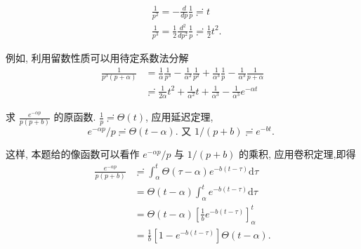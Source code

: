 $$    \begin{aligned}
    & \frac{1}{p^2}=-\frac{d}{d p} \frac{1}{p} \risingdotseq  t \\
    & \frac{1}{p^3}=\frac{1}{2} \frac{d^2}{d p^2} \frac{1}{p} \risingdotseq \frac{1}{2} t^2 .
    \end{aligned}$$


例如, 利用留数性质可以用待定系数法分解
$$
    \begin{aligned}
    \frac{1}{p^3(p+\alpha)} & =\frac{1}{\alpha} \frac{1}{p^3}-\frac{1}{\alpha^2} \frac{1}{p^2}+\frac{1}{\alpha^3} \frac{1}{p}-\frac{1}{\alpha^3} \frac{1}{p+\alpha} \\
    & \risingdotseq \frac{1}{2 \alpha} t^2+\frac{1}{\alpha^2} t+\frac{1}{\alpha^3}-\frac{1}{\alpha^3} e^{-\alpha t}
    \end{aligned}
$$

\begin{examplebox}{求 $\frac{e^{-\alpha p}}{p(p+b)}$ 的原函数.}
    $\frac{1}{p} \risingdotseq \Theta(t)$, 应用延迟定理,
    $$
e^{-\alpha p} / p \risingdotseq \Theta(t-\alpha) \text {. 又 } 1 /(p+b) \risingdotseq e^{-b t} \text {. }
$$

这样, 本题给的像函数可以看作 $e^{-\alpha p} / p$ 与 $1 /(p+b)$ 的乘积, 应用卷积定理,即得
$$
\begin{aligned}
\frac{e^{-\alpha p}}{p(p+b)} & \risingdotseq \int_\alpha^t \Theta(\tau-\alpha) e^{-b(t-\tau)} \mathrm{d} \tau \\
& =\Theta(t-\alpha) \int_\alpha^t e^{-b(t-\tau)} \mathrm{d} \tau \\
& =\Theta(t-\alpha)\left[\frac{1}{b} e^{-b(t-\tau)}\right]_\alpha^t \\
& =\frac{1}{b}\left[1-e^{-b(t-\tau)}\right] \Theta(t-\alpha) .
\end{aligned}
$$
\end{examplebox}

